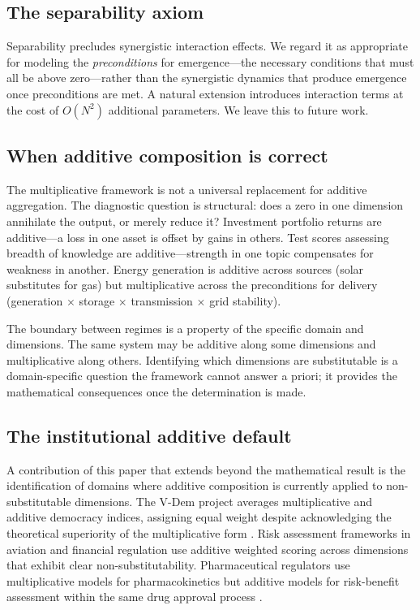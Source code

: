 \documentclass[12pt, a4paper]{article}
\theoremstyle{definition}
\theoremstyle{remark}
\begin{document}
\subsection{The separability axiom}\label{sec:separability}

Separability precludes synergistic interaction effects. We regard it as appropriate for modeling the \textit{preconditions} for emergence---the necessary conditions that must all be above zero---rather than the synergistic dynamics that produce emergence once preconditions are met. A natural extension introduces interaction terms at the cost of $O(N^2)$ additional parameters. We leave this to future work.

\subsection{When additive composition is correct}\label{sec:whenadd}

The multiplicative framework is not a universal replacement for additive aggregation. The diagnostic question is structural: does a zero in one dimension annihilate the output, or merely reduce it? Investment portfolio returns are additive---a loss in one asset is offset by gains in others. Test scores assessing breadth of knowledge are additive---strength in one topic compensates for weakness in another. Energy generation is additive across sources (solar substitutes for gas) but multiplicative across the preconditions for delivery (generation $\times$ storage $\times$ transmission $\times$ grid stability).

The boundary between regimes is a property of the specific domain and dimensions. The same system may be additive along some dimensions and multiplicative along others. Identifying which dimensions are substitutable is a domain-specific question the framework cannot answer a priori; it provides the mathematical consequences once the determination is made.

\subsection{The institutional additive default}

A contribution of this paper that extends beyond the mathematical result is the identification of domains where additive composition is currently applied to non-substitutable dimensions. The V-Dem project averages multiplicative and additive democracy indices, assigning equal weight despite acknowledging the theoretical superiority of the multiplicative form \cite{coppedge2018}. Risk assessment frameworks in aviation and financial regulation use additive weighted scoring across dimensions that exhibit clear non-substitutability. Pharmaceutical regulators use multiplicative models for pharmacokinetics but additive models for risk-benefit assessment within the same drug approval process \cite{fda2003}.
\end{document}
